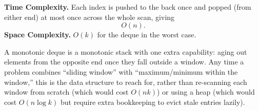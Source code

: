 \begin{complexitybox}
\textbf{Time Complexity.} Each index is pushed to the back once and
popped (from either end) at most once across the whole scan, giving
\[
  O(n).
\]
\textbf{Space Complexity.} $O(k)$ for the deque in the worst case.
\end{complexitybox}

\begin{takeawaybox}
A monotonic deque is a monotonic stack with one extra capability: aging
out elements from the opposite end once they fall outside a window. Any
time a problem combines ``sliding window'' with ``maximum/minimum within
the window,'' this is the data structure to reach for, rather than
re-scanning each window from scratch (which would cost $O(nk)$) or using
a heap (which would cost $O(n \log k)$ but require extra bookkeeping to
evict stale entries lazily).
\end{takeawaybox}
